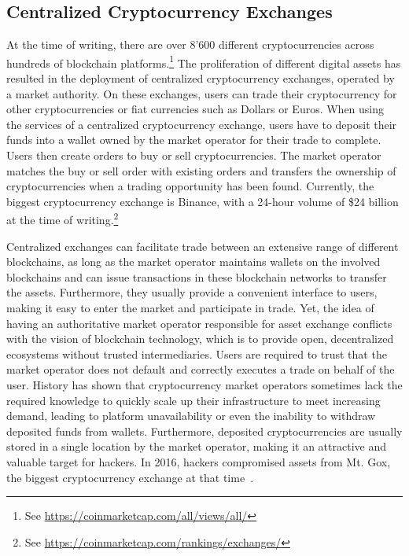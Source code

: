 \subsection{Centralized Cryptocurrency Exchanges}
At the time of writing, there are over 8'600 different cryptocurrencies across hundreds of blockchain platforms.\footnote{See \url{https://coinmarketcap.com/all/views/all/}}
The proliferation of different digital assets has resulted in the deployment of centralized cryptocurrency exchanges, operated by a market authority.
On these exchanges, users can trade their cryptocurrency for other cryptocurrencies or fiat currencies such as Dollars or Euros.
When using the services of a centralized cryptocurrency exchange, users have to deposit their funds into a wallet owned by the market operator for their trade to complete.
Users then create orders to buy or sell cryptocurrencies.
The market operator matches the buy or sell order with existing orders and transfers the ownership of cryptocurrencies when a trading opportunity has been found.
Currently, the biggest cryptocurrency exchange is Binance, with a 24-hour volume of \$24 billion at the time of writing.\footnote{See \url{https://coinmarketcap.com/rankings/exchanges/}}

Centralized exchanges can facilitate trade between an extensive range of different blockchains, as long as the market operator maintains wallets on the involved blockchains and can issue transactions in these blockchain networks to transfer the assets.
Furthermore, they usually provide a convenient interface to users, making it easy to enter the market and participate in trade.
Yet, the idea of having an authoritative market operator responsible for asset exchange conflicts with the vision of blockchain technology, which is to provide open, decentralized ecosystems without trusted intermediaries.
Users are required to trust that the market operator does not default and correctly executes a trade on behalf of the user.
History has shown that cryptocurrency market operators sometimes lack the required knowledge to quickly scale up their infrastructure to meet increasing demand, leading to platform unavailability or even the inability to withdraw deposited funds from wallets.
Furthermore, deposited cryptocurrencies are usually stored in a single location by the market operator, making it an attractive and valuable target for hackers.
In 2016, hackers compromised assets from Mt. Gox, the biggest cryptocurrency exchange at that time~\cite{trautman2014virtual}.

